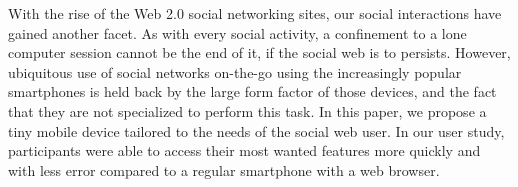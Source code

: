 With the rise of the Web 2.0 social networking sites, our social interactions
have gained another facet. As with every social activity, a confinement
to a lone computer session cannot be the end of it, if the social web is 
to persists. However, ubiquitous use of social networks on-the-go using 
the increasingly popular smartphones is held back by the large form factor of 
those devices, and the fact that they are not specialized to perform this 
task. In this paper, we propose a tiny mobile device tailored to the needs 
of the social web user. In our user study, participants were able to access
their most wanted features more quickly and with less error compared to a 
regular smartphone with a web browser.
